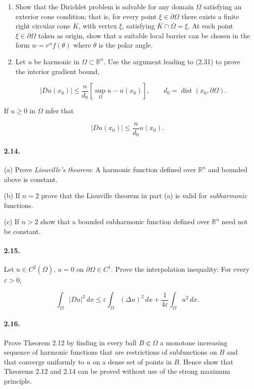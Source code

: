 \begin{enumerate}
\item[2.12.] Show that the Dirichlet problem is solvable for any domain $\Omega$ satisfying an exterior cone condition; that is, for every point $\xi\in\partial\Omega$ there exists a finite right circular cone $K$, with vertex $\xi$, satisfying $\overline{K}\cap\overline{\Omega}=\xi$. At each point $\xi\in\partial\Omega$ taken as origin, show that a suitable local barrier can be chosen in the form $w=r^\alpha f(\theta)$ where $\theta$ is the polar angle.

\item[2.13.] Let $u$ be harmonic in $\Omega\subset\mathbb{R}^n$. Use the argument leading to (2.31) to prove the interior gradient bound,

\[
|Du(x_0)|\le \frac{n}{d_0}\left[\sup_{\Omega} u-u(x_0)\right],\qquad d_0=\operatorname{dist}(x_0,\partial\Omega).
\]
\end{enumerate}


If $u \geq 0$ in $\Omega$ infer that

\[
\lvert Du(x_0)\rvert \leq \frac{n}{d_0}u(x_0).
\]

\paragraph{2.14.} (a) Prove \emph{Liouville's theorem}: A harmonic function defined over $\mathbb{R}^n$ and bounded above is constant.

(b) If $n=2$ prove that the Liouville theorem in part (a) is valid for \emph{subharmonic} functions.

(c) If $n>2$ show that a bounded subharmonic function defined over $\mathbb{R}^n$ need not be constant.

\paragraph{2.15.} Let $u \in C^2(\overline{\Omega})$, $u = 0$ on $\partial \Omega \in C^1$. Prove the interpolation inequality: For every $\varepsilon > 0$,

\[
\int_{\Omega} \lvert Du\rvert^2\,dx \leq \varepsilon \int_{\Omega} (\Delta u)^2\,dx + \frac{1}{4\varepsilon}\int_{\Omega} u^2\,dx.
\]

\paragraph{2.16.} Prove Theorem 2.12 by finding in every ball $B \Subset \Omega$ a monotone increasing sequence of harmonic functions that are restrictions of subfunctions on $B$ and that converge uniformly to $u$ on a dense set of points in $B$. Hence show that Theorems 2.12 and 2.14 can be proved without use of the strong maximum principle.

